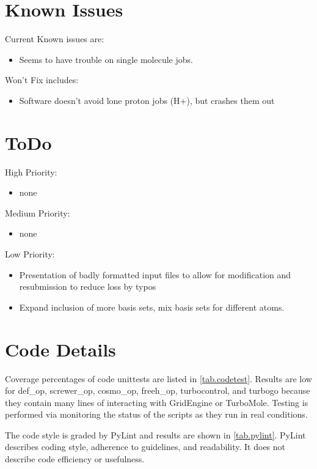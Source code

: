 \section{Known Issues}


Current Known issues are:
\begin{itemize}
 \item Seems to have trouble on single molecule jobs.
\end{itemize}

Won't Fix includes:
\begin{itemize}
 \item Software doesn't avoid lone proton jobs (H+), but crashes them out
\end{itemize}

\section{ToDo}

High Priority: 
\begin{itemize}
 \item none
\end{itemize}

Medium Priority:
\begin{itemize}
 \item none
\end{itemize}

Low Priority: 
\begin{itemize}
 \item Presentation of badly formatted input files to allow for modification and resubmission to reduce loss by typos
 \item Expand inclusion of more basis sets, mix basis sets for different atoms.
\end{itemize}


\section{Code Details}

Coverage percentages of code unittests are listed in \autoref{tab.codetest}. Results are low for def\_op, screwer\_op, cosmo\_op, freeh\_op, turbocontrol, and turbogo because they contain many lines of interacting with GridEngine or TurboMole. Testing is performed via monitoring the status of the scripts as they run in real conditions.

The code style is graded by PyLint and results are shown in \autoref{tab.pylint}. PyLint describes coding style, adherence to guidelines, and readability. It does not describe code efficiency or usefulness.

